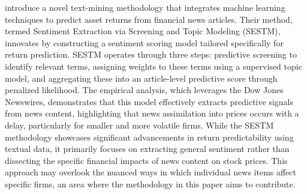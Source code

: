 \cite{ke2019predicting} introduce a novel text-mining methodology that integrates machine learning techniques to predict asset returns from financial news articles. Their method, termed Sentiment Extraction via Screening and Topic Modeling (SESTM), innovates by constructing a sentiment scoring model tailored specifically for return prediction. SESTM operates through three steps: predictive screening to identify relevant terms, assigning weights to these terms using a supervised topic model, and aggregating these into an article-level predictive score through penalized likelihood. The empirical analysis, which leverages the Dow Jones Newswires, demonstrates that this model effectively extracts predictive signals from news content, highlighting that news assimilation into prices occurs with a delay, particularly for smaller and more volatile firms. While the SESTM methodology showcases significant advancements in return predictability using textual data, it primarily focuses on extracting general sentiment rather than dissecting the specific financial impacts of news content on stock prices. This approach may overlook the nuanced ways in which individual news items affect specific firms, an area where the methodology in this paper aims to contribute. 



\mx 


